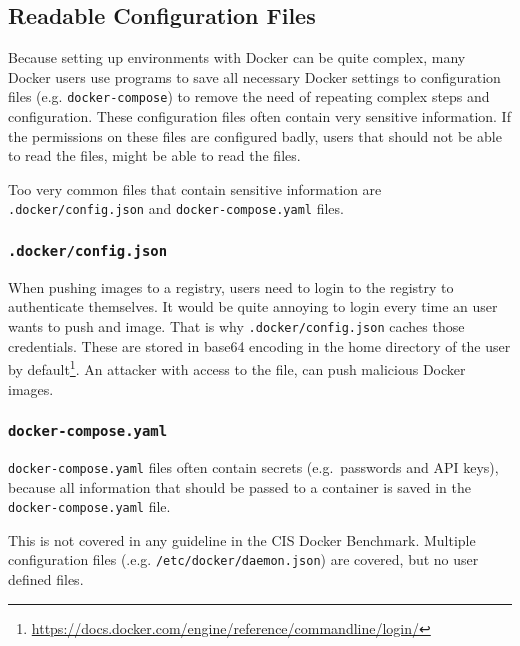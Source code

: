 \subsection{Readable Configuration Files}\label{subsection:config-files}
Because setting up environments with Docker can be quite complex, many Docker users use programs to save all necessary Docker settings to configuration files (e.g. \lstinline{docker-compose}) to remove the need of repeating complex steps and configuration. These configuration files often contain very sensitive information. If the permissions on these files are configured badly, users that should not be able to read the files, might be able to read the files.

Too very common files that contain sensitive information are \lstinline{.docker/config.json} and \lstinline{docker-compose.yaml} files.

\subsubsection{\texorpdfstring{\lstinline{.docker/config.json}}{.docker/config.json}}
When pushing images to a registry, users need to login to the registry to authenticate themselves.
It would be quite annoying to login every time an user wants to push and image. That is why \lstinline{.docker/config.json} caches those credentials. These are stored in base64 encoding in the home directory of the user by default\footnote{\url{https://docs.docker.com/engine/reference/commandline/login/}}. An attacker with access to the file, can push malicious Docker images\cite{Docker-Credentials-Metasploit}.

\subsubsection{\texorpdfstring{\lstinline{docker-compose.yaml}}{docker-compose.yaml}}
\lstinline{docker-compose.yaml} files often contain secrets (e.g.\ passwords and API keys), because all information that should be passed to a container is saved in the \lstinline{docker-compose.yaml} file.

\hfill

This is not covered in any guideline in the CIS Docker Benchmark. Multiple configuration files (.e.g. \lstinline{/etc/docker/daemon.json}) are covered, but no user defined files.
